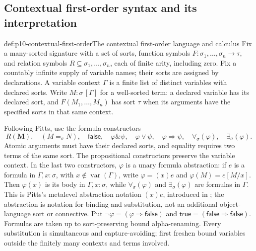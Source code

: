 
\subsection{Contextual first-order syntax and its interpretation}
\label{sec:p10-first-order-categorical-semantics}

\begin{hbdefinition}{def:p10-contextual-first-order}{The contextual first-order language and calculus}
Fix a many-sorted signature with a set of sorts, function symbols
\(F:\sigma_1,\ldots,\sigma_n\to\tau\), and relation symbols
\(R\subseteq\sigma_1,\ldots,\sigma_n\), each of finite arity,
including zero. Fix a countably infinite supply of variable names;
their sorts are assigned by declarations. A variable context \(\Gamma\) is a finite list of
distinct variables with declared sorts. Write \(M:\sigma\,[\Gamma]\)
for a well-sorted term: a declared variable has its declared sort,
and \(F(M_1,\ldots,M_n)\) has sort \(\tau\) when its arguments have
the specified sorts in that same context.

Following Pitts, use the formula constructors
\[
 R(\mathbf M),\quad (M=_\sigma N),\quad\mathsf{false},\quad
 \varphi\mathbin{\&}\psi,\quad\varphi\vee\psi,\quad
 \varphi\Rightarrow\psi,\quad
 \forall_\sigma(\varphi),\quad\exists_\sigma(\varphi).
\]
Atomic arguments must have their declared sorts, and equality requires
two terms of the same sort. The propositional constructors preserve the
variable context. In the last two constructors, \(\varphi\) is a
unary formula abstraction: if \(e\) is a formula in
\(\Gamma,x:\sigma\), with \(x\notin\operatorname{var}(\Gamma)\),
write \(\varphi=(x)e\) and \(\varphi(M)=e[M/x]\).
Then \(\varphi(x)\) is its body in \(\Gamma,x:\sigma\), while
\(\forall_\sigma(\varphi)\) and \(\exists_\sigma(\varphi)\) are
formulas in \(\Gamma\). This is Pitts's metalevel abstraction
notation \((x)e\), introduced in \cite[\S3, p.~13]{Pitts1995Draft};
the abstraction is notation for binding and substitution, not an
additional object-language sort or connective.
Put \(\neg\varphi=(\varphi\Rightarrow\mathsf{false})\) and
\(\mathsf{true}=(\mathsf{false}\Rightarrow\mathsf{false})\).
Formulas are taken up to sort-preserving bound alpha-renaming.
Every substitution is simultaneous and capture-avoiding; first freshen
bound variables outside the finitely many contexts and terms involved.


\end{hbdefinition}
